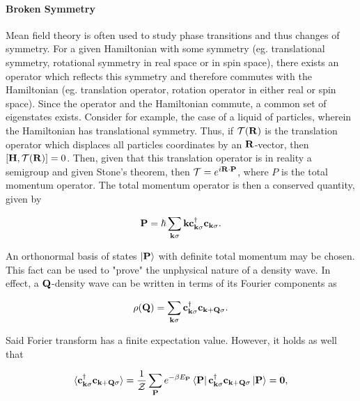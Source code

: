 \paragraph{\textbf{Broken Symmetry}}

Mean field theory is often used to study phase transitions and thus changes of symmetry. For a given Hamiltonian with some symmetry (eg. translational symmetry, rotational symmetry in real space or in spin space), there exists an operator which reflects this symmetry and therefore commutes with the Hamiltonian (eg. translation operator, rotation operator in either real or spin space). Since the operator and the Hamiltonian commute, a common set of eigenstates exists. Consider for example, the case of a liquid of particles, wherein the Hamiltonian has translational symmetry. Thus, if ${\mathcal{T}}({\bf R})$ is the translation operator which displaces all particles coordinates by an ${\bf R}$-vector, then $[{\bf H}, {\mathcal{T}}({\bf R})] = 0$. Then, given that this translation operator is in reality a semigroup and given Stone's theorem, then ${\mathcal{T}} = e^{i {\bf R} \cdot {\bf P}}$, where $P$ is the total momentum operator. The total momentum operator is then a conserved quantity, given by 

$$
    {\bf P} = \hbar \sum_{{\bf k} \sigma} {\bf k} {\bf c}^\dagger_{{\bf k} \sigma} {\bf c}_{{\bf k} \sigma}.
$$

An orthonormal basis of states $\ket{{\bf P}}$ with definite total momentum may be chosen. This fact can be used to "prove" the unphysical nature of a density wave. In effect, a ${\bf Q}$-density wave can be written in terms of its Fourier components as 

$$
\rho({\bf Q}) = \sum_{{\bf k}\sigma} {\bf c}_{{\bf k}\sigma}^\dagger {\bf c}_{{\bf k + Q}\sigma}.
$$

Said Forier transform has a finite expectation value. However, it holds as well that

$$
\langle {\bf c}_{{\bf k}\sigma}^\dagger {\bf c}_{{\bf k} + {\bf Q}\sigma} \rangle = \frac{1}{\mathcal{Z}} \sum_{{\bf P}} e^{-\beta E_{{\bf P}}} \bra{{\bf P}} {\bf c}_{{\bf k}\sigma}^\dagger {\bf c}_{{\bf k + Q}\sigma} \ket{{\bf P}} = 0,
$$

